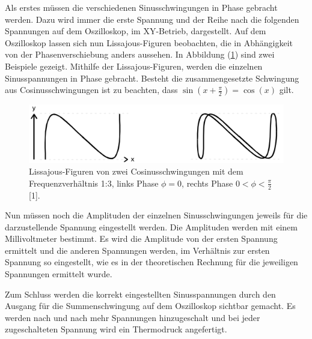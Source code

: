 Als erstes müssen die verschiedenen Sinusschwingungen in Phase gebracht werden. Dazu
wird immer die erste Spannung und der Reihe nach die folgenden Spannungen auf
dem Oszilloskop, im XY-Betrieb, dargestellt. Auf dem Oszilloskop lassen sich nun
Lissajous-Figuren beobachten, die in Abhängigkeit von der Phasenverschiebung
anders aussehen. In Abbildung (\ref{fig:2}) sind zwei Beispiele gezeigt.
Mithilfe der Lissajous-Figuren, werden die einzelnen Sinusspannungen in Phase gebracht.
Besteht die zusammengesetzte Schwingung aus Cosinusschwingungen ist zu beachten,
dass $\sin\left(x + \frac{\pi}{2}\right) = \cos(x)$ gilt.

\begin{figure}[H]
  \centering
  \includegraphics{Durchfuerung1.png}
  \caption{Lissajous-Figuren von zwei Cosinusschwingungen mit dem Frequenzverhältnis 1:3, links
  Phase $\phi=0$, rechts Phase $0<\phi<\frac{\pi}{2}$ [1].}
  \label{fig:2}
\end{figure}

Nun müssen noch die Amplituden der einzelnen Sinusschwingungen jeweils für die
darzustellende Spannung eingestellt werden. Die Amplituden werden mit einem
Millivoltmeter bestimmt. Es wird die Amplitude von der ersten Spannung ermittelt
und die anderen Spannungen werden, im Verhältnis zur ersten Spannung so eingestellt,
wie es in der theoretischen Rechnung für die jeweiligen Spannungen ermittelt wurde.

Zum Schluss werden die korrekt eingestellten Sinusspannungen durch den Ausgang
für die Summenschwingung auf dem Oszilloskop sichtbar gemacht. Es werden nach und
nach mehr Spannungen hinzugeschalt und bei jeder zugeschalteten Spannung wird ein
Thermodruck angefertigt.
